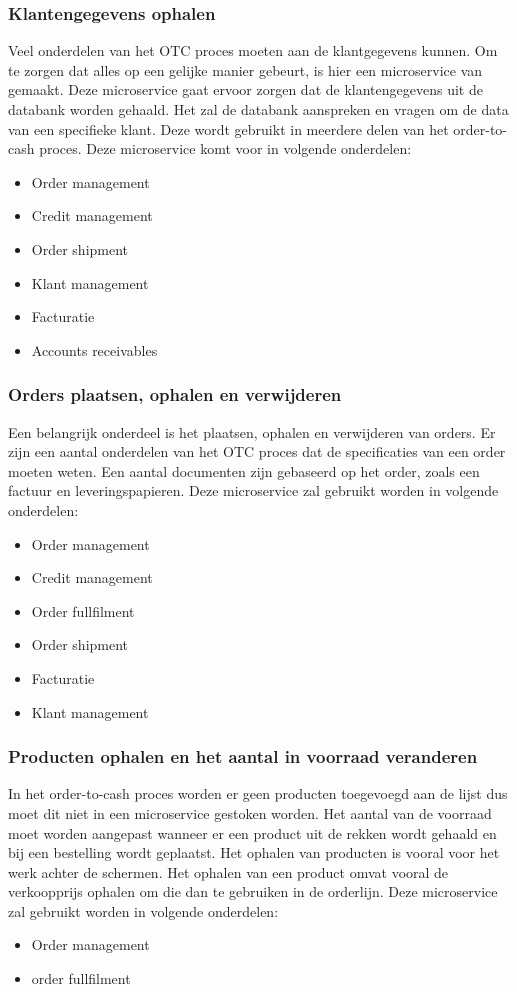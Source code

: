 \subsubsection{Klantengegevens ophalen}
Veel onderdelen van het OTC proces moeten aan de klantgegevens kunnen. Om te zorgen dat alles op een gelijke manier gebeurt, is hier een microservice van gemaakt.
Deze microservice gaat ervoor zorgen dat de klantengegevens uit de databank worden gehaald. Het zal de databank aanspreken en vragen om de data van een specifieke klant. 
Deze wordt gebruikt in meerdere delen van het order-to-cash proces. 
Deze microservice komt voor in volgende onderdelen:
\begin{itemize}
	\item Order management
	\item Credit management
	\item Order shipment
	\item Klant management
	\item Facturatie
	\item Accounts receivables
\end{itemize}

\subsubsection{Orders plaatsen, ophalen en verwijderen}
Een belangrijk onderdeel is het plaatsen, ophalen en verwijderen van orders. Er zijn een aantal onderdelen van het OTC proces dat de specificaties van een order moeten weten. Een aantal documenten zijn gebaseerd op het order, zoals een factuur en leveringspapieren. 
Deze microservice zal gebruikt worden in volgende onderdelen:
\begin{itemize}
	\item Order management
	\item Credit management
	\item Order fullfilment
	\item Order shipment
	\item Facturatie
	\item Klant management
\end{itemize}

\subsubsection{Producten ophalen en het aantal in voorraad veranderen}
In het order-to-cash proces worden er geen producten toegevoegd aan de lijst dus moet dit niet in een microservice gestoken worden. Het aantal van de voorraad moet worden aangepast wanneer er een product uit de rekken wordt gehaald en bij een bestelling wordt geplaatst. Het ophalen van producten is vooral voor het werk achter de schermen. Het ophalen van een product omvat vooral de verkoopprijs ophalen om die dan te gebruiken in de orderlijn. 
Deze microservice zal gebruikt worden in volgende onderdelen:
\begin{itemize}
	\item Order management
	\item order fullfilment
\end{itemize}

